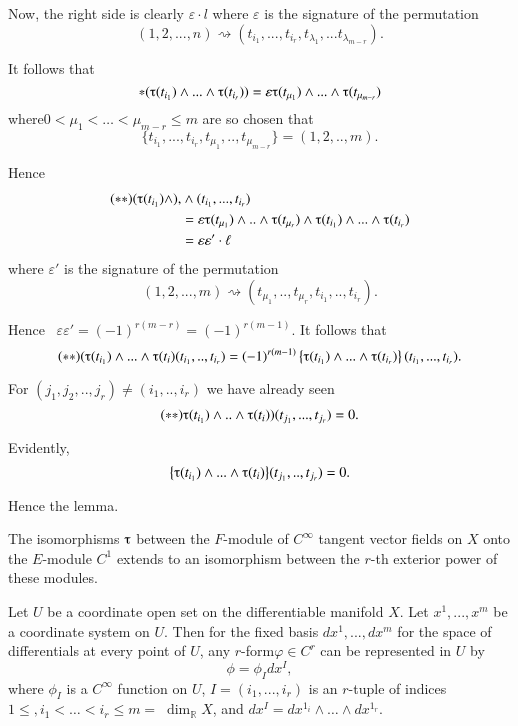 Now, the right side is clearly $\varepsilon \cdot l$ where $\varepsilon$ is
the signature of the permutation 
$$
(1,2,...,n)\rightsquigarrow(t_{i_1},...,t_{i_r},t_{\lambda_1},
... t_{\lambda_{m-r}}).  
$$

It follows that
$$
*(\tauup(t_{i_1})\wedge...\wedge \tauup(t_{i_r}))=\varepsilon
\tauup(t_{\mu_1})\wedge...\wedge \tauup(t_{\mu_{m-r}})
$$
where\pageoriginale $0 < \mu_1 < \ldots < \mu_{m-r}\le m$ are so chosen that
$$
\big\{t_{i_1},...,t_{i_r},
t_{\mu_1},..,t_{\mu_{m-r}}\big\}=(1,2,..,m).
$$

Hence 
\begin{align*}
  (**)(\tauup(t_{i_1})\wedge), & \wedge (t_{i_1},..., t_{i_r})\\
  &=\varepsilon\tauup(t_{\mu_1})\wedge.. \wedge \tauup(t_{\mu_r})\wedge
  \tauup(t_{i_1})\wedge...\wedge \tauup (t_{i_r})\\ 
  &=\varepsilon \varepsilon' \cdot \ell
\end{align*}
where $\varepsilon'$ is the signature of the permutation
$$
(1,2,...,m)\rightsquigarrow(t_{\mu_1},..,t_{\mu_r},
t_{i_1},..,t_{i_r}).
$$

Hence ~$\varepsilon \varepsilon'=(-1)^{r(m-r)}=(-1)^{r(m-1)}$. It follows that
$$
(**)(\tauup(t_{i_1})\wedge...\wedge \tauup(t_i)(t_{i_1},..,t_{i_r}) = 
(-1)^{r(m-1)} \left\{ \tauup(t_{i_1})\wedge...\wedge
\tauup(t_{i_r})\right\}(t_{i_1},...,t_{i_r}).
$$

For $(j_1, j_2,..,j_r)\neq (i_1,..,i_r)$ we have already seen
$$
(**)\tauup (t_{i_1})\wedge..\wedge \tauup(t_i))(t_{j_1},...,t_{j_r})=0.
$$

Evidently,
$$
\big\{\tauup (t_{i_1})\wedge...\wedge \tauup(t_i)\big\}(t_{j_1},..,t_{j_r})=0.
$$

Hence the lemma.

The isomorphisms $\tauup$ between the $F$-module of $C^\infty$ tangent
vector fields on $X$ onto the $E$-module $C^1$ extends to an isomorphism
between the $r$-th exterior power of these modules. 

Let $U$ be a coordinate open set on the differentiable manifold
$X$. Let $x^1,...,x^m$ be a coordinate system on $U$. Then for the fixed
basis $dx^1,...,dx^m$ for the space of differentials at every point of
$U$, any $r$-form\pageoriginale $\varphi \in C^r$ can be represented
in $U$ by  
$$
\phi=\phi_I dx^I,
$$
where $\phi_I$ is a $C^\infty$ function on $U$, $I=(i_1,...,i_r)$ is an
$r$-tuple of  indices $1 \le, i_1 < \ldots < i_r \le m=\; {\dim}_{\mathbb{R}}
X$, and $dx^I  = dx^{1_i} \wedge \ldots \wedge dx^{1_r}$. 

